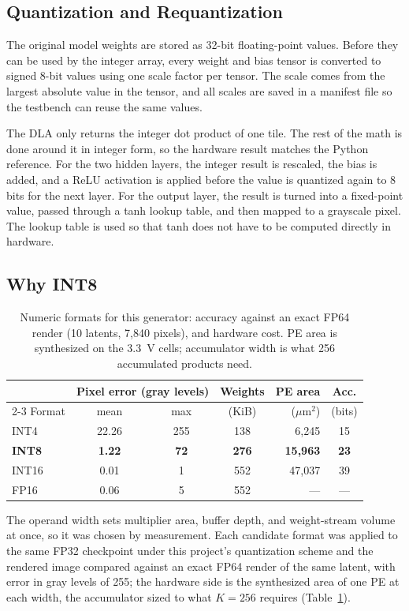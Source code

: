 \documentclass[conference,a4paper]{APSIPA2026}
\begin{document}
\subsection{Quantization and Requantization}
The original model weights are stored as 32-bit floating-point values. Before they can be used by the integer array, every weight and bias tensor is converted to signed 8-bit values using one scale factor per tensor. The scale comes from the largest absolute value in the tensor, and all scales are saved in a manifest file so the testbench can reuse the same values.

The DLA only returns the integer dot product of one tile. The rest of the math is done around it in integer form, so the hardware result matches the Python reference. For the two hidden layers, the integer result is rescaled, the bias is added, and a ReLU activation is applied before the value is quantized again to 8 bits for the next layer. For the output layer, the result is turned into a fixed-point value, passed through a tanh lookup table, and then mapped to a grayscale pixel. The lookup table is used so that tanh does not have to be computed directly in hardware.

\subsection{Why INT8}\label{sec:format}

\begin{table}[!ht]
\caption{Numeric formats for this generator: accuracy against an exact FP64 render (10 latents, 7{,}840 pixels), and hardware cost. PE area is synthesized on the 3.3~V cells; accumulator width is what 256 accumulated products need.}
\label{tab:format}
\centering
\renewcommand{\arraystretch}{1.08}
\begin{tabular}{@{}lcccrc@{}}
\toprule
 & \multicolumn{2}{c}{Pixel error (gray levels)} & Weights & PE area & Acc. \\
\cmidrule(lr){2-3}
Format & mean & max & (KiB) & ($\mu$m$^2$) & (bits) \\
\midrule
INT4   & 22.26 & 255 & 138 & 6{,}245  & 15 \\
\textbf{INT8}  & \textbf{1.22} & \textbf{72} & \textbf{276} & \textbf{15{,}963} & \textbf{23} \\
INT16  & 0.01  & 1   & 552 & 47{,}037 & 39 \\
FP16   & 0.06  & 5   & 552 & ---      & --- \\
\bottomrule
\end{tabular}
\end{table}
The operand width sets multiplier area, buffer depth, and weight-stream volume at once, so it was chosen by measurement. Each candidate format was applied to the same FP32 checkpoint under this project's quantization scheme and the rendered image compared against an exact FP64 render of the same latent, with error in gray levels of 255; the hardware side is the synthesized area of one PE at each width, the accumulator sized to what $K=256$ requires (Table~\ref{tab:format}).
\end{document}
